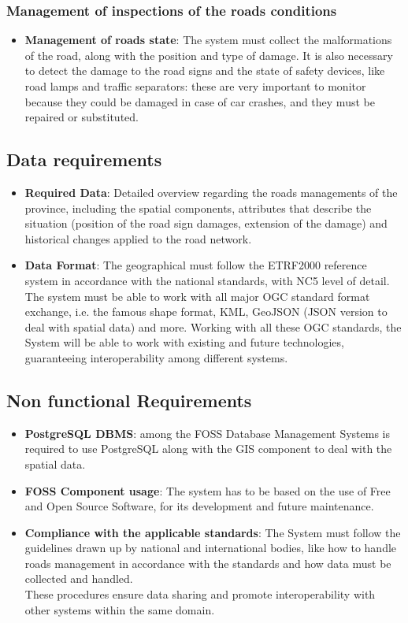     \subsubsection{\textbf{Management of inspections of the roads conditions}} 
    \begin{itemize}
        \item{\textbf{Management of roads state}}: The system must collect the malformations of the road, along with the position and type of damage.
        It is also necessary to detect the damage to the road signs and the state of safety devices, like road lamps and traffic separators: these are very important to monitor because they could be damaged in case of car crashes, and they must be repaired or substituted.
     \end{itemize}

     \subsection{Data requirements}
        \begin{itemize}
            \item \textbf{Required Data}: Detailed overview regarding the roads managements of the province, including the spatial components, attributes that describe the situation (position of the road sign damages, extension of the damage) and historical changes applied to the road network.
             \item \textbf{Data Format}:  The geographical must follow the ETRF2000 reference system in accordance with the national standards, with NC5 level of detail.
             The system must be able to work with all major OGC standard format exchange, i.e. the famous shape format, KML, GeoJSON (JSON version to deal with spatial data) and more.
             Working with all these OGC standards, the System will be able to work with existing and future technologies, guaranteeing interoperability among different systems.
        \end{itemize}
\pagebreak
\subsection{Non functional Requirements}
\begin{itemize}
    \item \textbf{PostgreSQL DBMS}: among the FOSS Database
    Management Systems is required to use PostgreSQL along with the GIS component to deal with the spatial data.
     \item \textbf{FOSS Component usage}: The system has to be based on the use of Free and Open Source Software, for its development and future maintenance.
    \item \textbf{Compliance with the applicable standards}: The System must follow the guidelines drawn up by national and international bodies, like how to handle roads management in accordance with the standards and how data must be collected and handled.
    \\
    These procedures ensure data sharing and promote interoperability with other systems within the same domain.
\end{itemize}